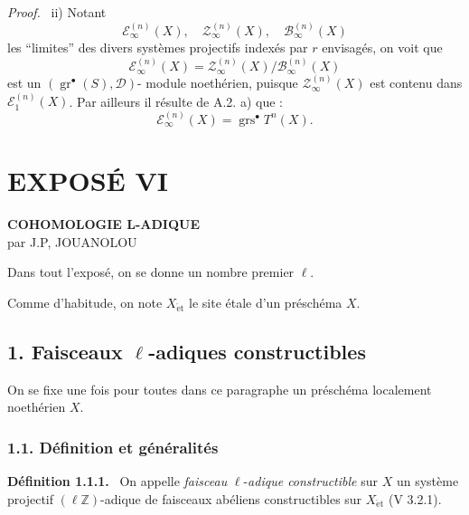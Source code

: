 \documentclass[11pt]{article}
\newenvironment{statement}[1]{\par\medskip\noindent\textbf{#1.}\ }{\par\medskip}
\newenvironment{prooftext}[1][Proof]{\par\noindent\emph{#1.}\ }{\par\medskip}
\providecommand{\gr}{\operatorname{gr}}
\providecommand{\gr}{\operatorname{gr}}
\providecommand{\gr}{\operatorname{gr}}
\providecommand{\grs}{\operatorname{grs}}
\begin{document}
\begin{prooftext}
ii) Notant
\[
\mathcal E_\infty^{(n)}(X),\quad
\mathcal Z_\infty^{(n)}(X),\quad
\mathcal B_\infty^{(n)}(X)
\]
les ``limites'' des divers systèmes projectifs indexés par \(r\) envisagés, on voit que
\[
\mathcal E_\infty^{(n)}(X)=
\mathcal Z_\infty^{(n)}(X)/\mathcal B_\infty^{(n)}(X)
\]
est un \((\gr^\bullet(S),\mathcal D)\)-
module noethérien, puisque \(\mathcal Z_\infty^{(n)}(X)\) est contenu dans \(\mathcal E_1^{(n)}(X)\). Par ailleurs il résulte de A.2. a) que :
\[
\mathcal E_\infty^{(n)}(X)=\grs^\bullet T^n(X).
\]
\end{prooftext}

\renewenvironment{prooftext}[1][Proof]{\par\noindent\emph{#1.}\ }{\par\medskip}
\section*{EXPOSÉ VI}

\begin{center}
\textbf{COHOMOLOGIE L-ADIQUE}\\[0.5em]
par J.P, JOUANOLOU
\end{center}

Dans tout l'exposé, on se donne un nombre premier \(\ell\).

Comme d'habitude, on note \(X_{\mathrm{\acute et}}\) le site étale d'un préschéma \(X\).

\subsection*{1. Faisceaux \(\ell\)-adiques constructibles}

On se fixe une fois pour toutes dans ce paragraphe un préschéma localement noethérien \(X\).

\subsubsection*{1.1. Définition et généralités}

\begin{statement}{Définition 1.1.1}
On appelle \emph{faisceau} \(\ell\)-\emph{adique constructible} sur \(X\) un système projectif \((\ell\mathbb Z)\)-adique de faisceaux abéliens constructibles sur \(X_{\mathrm{\acute et}}\) (V 3.2.1).
\end{statement}
\end{document}
